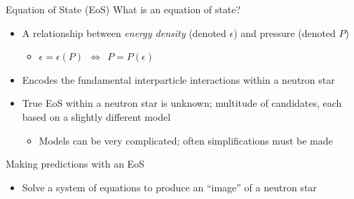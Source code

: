 \documentclass[]{beamer}
\begin{document}
    \begin{frame}{Equation of State (EoS)}
        What is an equation of state? \pause
        \begin{itemize}
            \item A relationship between \textit{energy density} (denoted $\epsilon$) \pause and pressure (denoted $P$) \pause \begin{itemize}
                \item $\epsilon = \epsilon (P)$\pause $~~ \Leftrightarrow ~~  P = P(\epsilon)$ \pause
            \end{itemize}
            \item Encodes the fundamental interparticle interactions within a neutron star \pause
            \item True EoS within a neutron star is unknown; \pause multitude of candidates, each based on a slightly different model \pause \begin{itemize}
                \item Models can be very complicated\pause ; often simplifications must be made \pause
            \end{itemize}
        \end{itemize}
        Making predictions with an EoS \pause
        \begin{itemize}
            \item Solve a system of equations to produce an ``image'' of a neutron star \pause
        \end{itemize}
    \end{frame}

\end{document}
